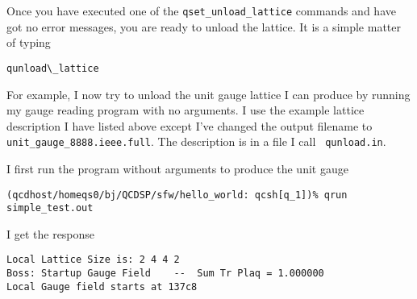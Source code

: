 Once you have executed one of the {\tt qset\_unload\_lattice} commands
and have got no error messages, you are ready to unload the lattice.
It is a simple matter of typing 
\begin{verbatim}
qunload\_lattice
\end{verbatim}

For example, I now try to unload the unit gauge lattice I can produce
by running my gauge reading program with no arguments.  I use the example 
lattice description I have listed above except I've changed the output filename
to {\tt unit\_gauge\_8888.ieee.full}.  The description is in a file I call {\tt
qunload.in}.

I first run the program without arguments to produce the unit gauge
\begin{verbatim}
(qcdhost/homeqs0/bj/QCDSP/sfw/hello_world: qcsh[q_1])% qrun simple_test.out 
\end{verbatim}
I get the response
\begin{verbatim}
Local Lattice Size is: 2 4 4 2
Boss: Startup Gauge Field    --  Sum Tr Plaq = 1.000000
Local Gauge field starts at 137c8
\end{verbatim}

